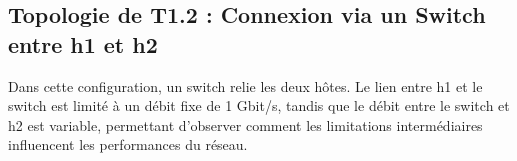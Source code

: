 \subsection{Topologie de T1.2 : Connexion via un Switch entre h1 et h2}
Dans cette configuration, un switch relie les deux hôtes. Le lien entre h1 et le switch est limité à un débit fixe de 1 Gbit/s, tandis que le débit entre le switch et h2 est variable, permettant d’observer comment les limitations intermédiaires influencent les performances du réseau.

